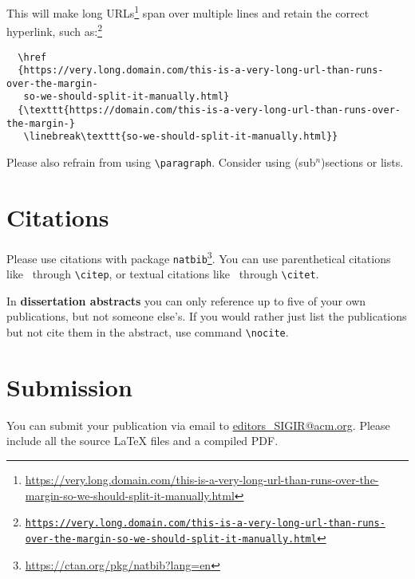 \documentclass[news]{sigirforum}
\begin{document}
This will make long URLs\footnote{\url{https://very.long.domain.com/this-is-a-very-long-url-than-runs-over-the-margin-so-we-should-split-it-manually.html}} span over multiple lines and retain the correct hyperlink, such as:\footnote{\href{https://very.long.domain.com/this-is-a-very-long-url-than-runs-over-the-margin-so-we-should-split-it-manually.html}{\texttt{https://very.long.domain.com/this-is-a-very-long-url-than-runs-over-the-margin-}\linebreak\texttt{so-we-should-split-it-manually.html}}}
\begin{verbatim}
  \href
  {https://very.long.domain.com/this-is-a-very-long-url-than-runs-over-the-margin-
   so-we-should-split-it-manually.html}
  {\texttt{https://domain.com/this-is-a-very-long-url-than-runs-over-the-margin-}
   \linebreak\texttt{so-we-should-split-it-manually.html}}
\end{verbatim}

Please also refrain from using \texttt{\textbackslash paragraph}. Consider using (sub$^n$)sections or lists.

\section{Citations}

Please use citations with package \texttt{natbib}\footnote{\url{https://ctan.org/pkg/natbib?lang=en}}.
You can use parenthetical citations like~\citep{forum} through \texttt{\textbackslash citep}, or textual citations like~\citet{forum} through \texttt{\textbackslash citet}.

In \textbf{dissertation abstracts} you can only reference up to five of your own publications, but not someone else's. If you would rather just list the publications but not cite them in the abstract, use command \texttt{\textbackslash nocite}.

\section{Submission}

You can submit your publication via email to \url{editors\_SIGIR@acm.org}. Please include all the source \LaTeX\xspace files and a compiled PDF.


\end{document}
